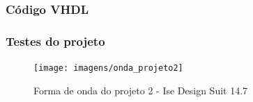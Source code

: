 \documentclass[12pts]{article}
\begin{document}
\clearpage
\subsubsection{Código VHDL}



\clearpage
\subsubsection{Testes do projeto}

\begin{figure}[!htb]
  \centering
  \texttt{[image: imagens/onda\_projeto2]}
  \caption{Forma de onda do projeto 2 - Ise Design Suit 14.7}
  \label{figRotulo}
\end{figure}
\fi
\end{document}
